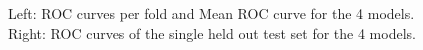 \documentclass[11pt, letterpaper, journal]{IEEEtran}
\begin{document}
\begin{figure}%
    \centering
    \qquad
    \caption{Left: ROC curves per fold and Mean ROC curve for the 4 models. Right: ROC curves of the single held out test set for the 4 models. }%
    \label{fig:ROC_curves scheme1}%
\end{figure}
\end{document}
